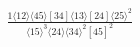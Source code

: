 \documentclass[varwidth, border=5pt]{standalone}
\begin{document}
\begin{my}
$\begin{gathered}
\scriptscriptstyle\frac{1⟨12⟩⟨45⟩[34]⟨13⟩[24]⟨25⟩^2}{⟨15⟩^3⟨24⟩⟨34⟩^2[45]^2}
\end{gathered}$
\end{my}
\end{document}
